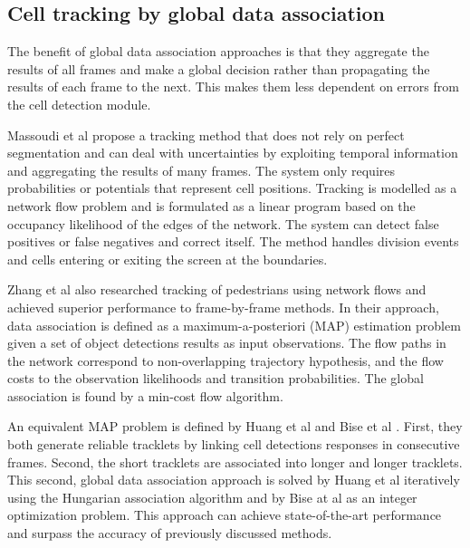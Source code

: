 \subsection{Cell tracking by global data association \statusfirstdraft}

The benefit of global data association approaches is that they aggregate the results of all frames and make a global decision rather than propagating the results of each frame to the next. This makes them less dependent on errors from the cell detection module.

Massoudi et al \cite{massoudi12} propose a tracking method that does not rely on perfect segmentation and can deal with uncertainties by exploiting temporal information and aggregating the results of many frames. The system only requires probabilities or potentials that represent cell positions. Tracking is modelled as a network flow problem and is formulated as a linear program based on the occupancy likelihood of the edges of the network. The system can detect false positives or false negatives and correct itself. The method handles division events and cells entering or exiting the screen at the boundaries.

Zhang et al \cite{zhang08} also researched tracking of pedestrians using network flows and achieved superior performance to frame-by-frame methods. In their approach, data association is defined as a maximum-a-posteriori (MAP) estimation problem given a set of object detections results as input observations. The flow paths in the network correspond to non-overlapping trajectory hypothesis, and the flow costs to the observation likelihoods and transition probabilities. The global association is found by a min-cost flow algorithm.

An equivalent MAP problem is defined by Huang et al \cite{huang08} and Bise et al \cite{bise11global}. First, they both generate reliable tracklets by linking cell detections responses in consecutive frames. Second, the short tracklets are associated into longer and longer tracklets. This second, global data association approach is solved by Huang et al iteratively using the Hungarian association algorithm \cite{kuhn55} and by Bise at al as an integer optimization problem. This approach can achieve state-of-the-art performance and surpass the accuracy of previously discussed methods.

